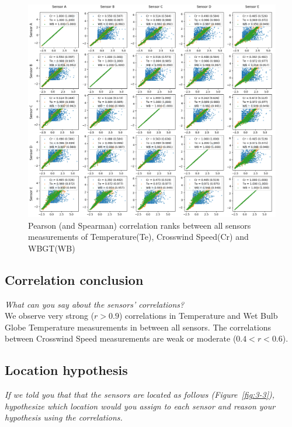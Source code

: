 \documentclass{article}
\begin{document}
\begin{figure}[!htb]
\centering
\includegraphics[width=\textwidth]{3-1-scatter.png}
\caption{Pearson (and Spearman) correlation ranks between all sensors measurements of Temperature(Te), Crosswind Speed(Cr) and WBGT(WB)}
\label{fig:3-1}
\end{figure}


\newpage

\subsection{Correlation conclusion}
\textit{
What can you say about the sensors’ correlations?
}\\

We observe very strong (\(r>0.9\)) correlations in Temperature and Wet Bulb Globe Temperature measurements in between all sensors.
The correlations between Crosswind Speed measurements are weak or moderate (\(0.4<r<0.6\)).


\subsection{Location hypothesis}
\textit{
If we told you that that the sensors are located as follows (Figure~\ref{fig:3-3}), hypothesize which location would you assign to each sensor and reason your hypothesis using the correlations.
}\\
\end{document}
